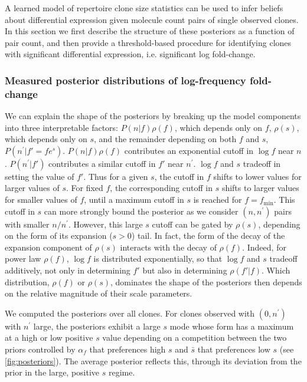 \documentclass[letterpaper,english,prl,reprint,longbibliography]{revtex4-1} %
\begin{document}
A learned model of repertoire clone size statistics can be used to infer beliefs about differential expression given molecule count pairs of single observed clones. In this section we first describe the structure of these posteriors as a function of pair count, and then provide a threshold-based procedure for identifying clones with significant differential expression, i.e. significant log fold-change.  

\subsubsection*{Measured posterior distributions of log-frequency fold-change}  

We can explain the shape of the posteriors by breaking up the model components into three interpretable factors: $P(n|f)\rho(f)$, which depends only on $f$, $\rho(s)$, which depends only on $s$, and the remainder depending on both $f$ and $s$, $P(n^{\prime}|f'=fe^s)$. 
$P(n|f)\rho(f)$ contributes an exponential cutoff in $\log f$ near $n$.
$P(n^{\prime}|f')$ contributes a similar cutoff in $f'$ near $n^{\prime}$. 
$\log f$ and $s$ tradeoff in setting the value of $f'$.
Thus for a given $s$, the cutoff in $f$ shifts to lower values for larger values of $s$.
For fixed $f$, the corresponding cutoff in $s$ shifts to larger values for smaller values of $f$, until a maximum cutoff in $s$ is reached for $f=f_\textrm{min}$.
This cutoff in $s$ can more strongly bound the posterior as we consider $(n,n^{\prime})$ pairs with smaller $n/n^{\prime}$.
However, this large $s$ cutoff can be gated by $\rho(s)$, depending on the form of its expansion ($s>0$) tail. 
In fact, the form of the decay of the expansion component of $\rho(s)$ interacts with the decay of $\rho(f)$. 
Indeed, for power law $\rho(f)$, $\log f$ is distributed exponentially, so that $\log f$ and $s$ tradeoff additively, not only in determining $f'$ but also in determining $\rho(f'|f)$.
Which distribution, $\rho(f)$ or $\rho(s)$, dominates the shape of the posteriors then depends on the relative magnitude of their scale parameters. 

We computed the posteriors over all clones. For clones observed with $(0,n^{\prime})$ with $n^{\prime}$ large, the posteriors exhibit a large $s$ mode whose form has a maximum at a high or low positive $s$ value depending on a competition between the two priors controlled by $\alpha_f$ that preferences high $s$ and $\bar{s}$ that preferences low $s$ (see \cref{fig:posteriors}). The average posterior reflects this, through its deviation from the prior in the large, positive $s$ regime.
\end{document}
